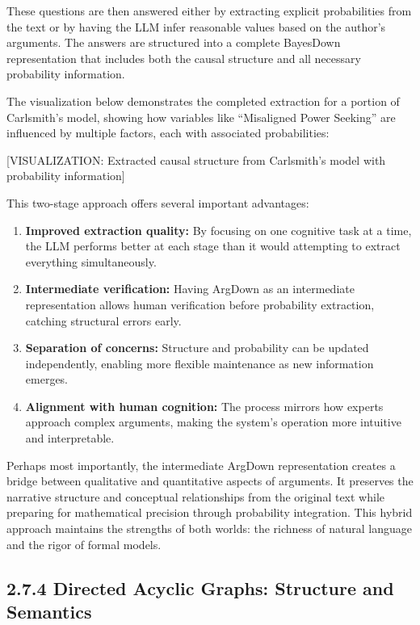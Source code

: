 \documentclass[
  11pt,
  letterpaper,
]{book}
\begin{document}
These questions are then answered either by extracting explicit
probabilities from the text or by having the LLM infer reasonable values
based on the author's arguments. The answers are structured into a
complete BayesDown representation that includes both the causal
structure and all necessary probability information.

The visualization below demonstrates the completed extraction for a
portion of Carlsmith's model, showing how variables like ``Misaligned
Power Seeking'' are influenced by multiple factors, each with associated
probabilities:

{[}VISUALIZATION: Extracted causal structure from Carlsmith's model with
probability information{]}

This two-stage approach offers several important advantages:

\begin{enumerate}
\def\labelenumi{\arabic{enumi}.}
\item
  \textbf{Improved extraction quality:} By focusing on one cognitive
  task at a time, the LLM performs better at each stage than it would
  attempting to extract everything simultaneously.
\item
  \textbf{Intermediate verification:} Having ArgDown as an intermediate
  representation allows human verification before probability
  extraction, catching structural errors early.
\item
  \textbf{Separation of concerns:} Structure and probability can be
  updated independently, enabling more flexible maintenance as new
  information emerges.
\item
  \textbf{Alignment with human cognition:} The process mirrors how
  experts approach complex arguments, making the system's operation more
  intuitive and interpretable.
\end{enumerate}

Perhaps most importantly, the intermediate ArgDown representation
creates a bridge between qualitative and quantitative aspects of
arguments. It preserves the narrative structure and conceptual
relationships from the original text while preparing for mathematical
precision through probability integration. This hybrid approach
maintains the strengths of both worlds: the richness of natural language
and the rigor of formal models.

\subsection*{2.7.4 Directed Acyclic Graphs: Structure and
Semantics}\label{sec-dag-structure}
\end{document}
